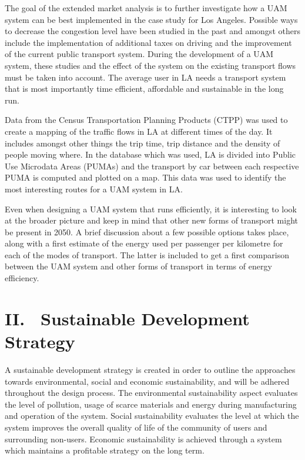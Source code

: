 The goal of the extended market analysis is to further investigate how a UAM system can be best implemented in the case study for Los Angeles. Possible ways to decrease the congestion level have been studied in the past and amongst others include the implementation of additional taxes on driving and the improvement of the current public transport system. During the development of a UAM system, these studies and the effect of the system on the existing transport flows must be taken into account. The average user in LA needs a transport system that is most importantly time efficient, affordable and sustainable in the long run. 

Data from the Census Transportation Planning Products (CTPP) was used to create a mapping of the traffic flows in LA at different times of the day. It includes amongst other things the trip time, trip distance and the density of people moving where. In the database which was used, LA is divided into Public Use Microdata Areas (PUMAs) and the transport by car between each respective PUMA is computed and plotted on a map. This data was used to identify the most interesting routes for a UAM system in LA. 

Even when designing a UAM system that runs efficiently, it is interesting to look at the broader picture and keep in mind that other new forms of transport might be present in 2050. A brief discussion about a few possible options takes place, along with a first estimate of the energy used per passenger per kilometre for each of the modes of transport. The latter is included to get a first comparison between the UAM system and other forms of transport in terms of energy efficiency. 

\section*{II. \ Sustainable Development Strategy}
\label{ES.SDS}

A sustainable development strategy is created in order to outline the approaches towards environmental, social and economic sustainability, and will be adhered throughout the design process. The environmental sustainability aspect evaluates the level of pollution, usage of scarce materials and energy during manufacturing and operation of the system. Social sustainability evaluates the level at which the system improves the overall quality of life of the community of users and surrounding non-users. Economic sustainability is achieved through a system which maintains a profitable strategy on the long term. 

